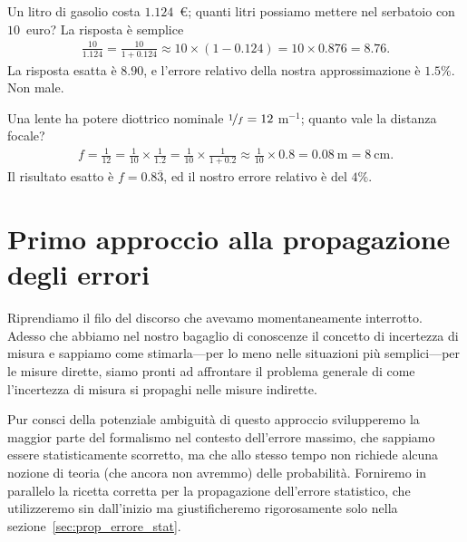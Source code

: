 \begin{examplebox}
  \begin{example}
    Un litro di gasolio costa $1.124$~\euro; quanti litri possiamo mettere nel
    serbatoio con $10$~euro? La risposta è semplice
    \begin{align*}
      \frac{10}{1.124} = \frac{10}{1 + 0.124}
      \approx 10 \times (1 - 0.124) = 10 \times 0.876 = 8.76.
    \end{align*}
    La risposta esatta è $8.90$, e l'errore relativo
    della nostra approssimazione è $1.5\%$. Non male.
  \end{example}
  \begin{example}
    Una lente ha potere diottrico nominale $\nicefrac{1}{f} = 12~$m$^{-1}$;
    quanto vale la distanza focale?
    \begin{align*}
      f = \frac{1}{12} = \frac{1}{10}\times\frac{1}{1.2} =
      \frac{1}{10}\times\frac{1}{1 + 0.2} \approx \frac{1}{10} \times 0.8 =
      0.08~\text{m} = 8~\text{cm}.
    \end{align*}
    Il risultato esatto è $f = 0.8\overline{3}$, ed il nostro errore
    relativo è del $4\%$.
  \end{example}
\end{examplebox}


\section{Primo approccio alla propagazione degli errori}
\label{sec:propagazione_errrore_max}

Riprendiamo il filo del discorso che avevamo momentaneamente interrotto.
Adesso che abbiamo nel nostro bagaglio di conoscenze il concetto di incertezza
di misura e sappiamo come stimarla---per lo meno nelle situazioni più
semplici---per le misure dirette, siamo pronti ad affrontare il problema
generale di come l'incertezza di misura si propaghi nelle misure indirette.

Pur consci della potenziale ambiguità di questo approccio svilupperemo
la maggior parte del formalismo nel contesto dell'errore massimo, che sappiamo
essere statisticamente scorretto, ma che allo stesso tempo non richiede alcuna
nozione di teoria (che ancora non avremmo) delle probabilità. Forniremo in
parallelo la ricetta corretta per la propagazione dell'errore
statistico, che utilizzeremo sin dall'inizio ma giustificheremo rigorosamente
solo nella sezione~\ref{sec:prop_errore_stat}.


